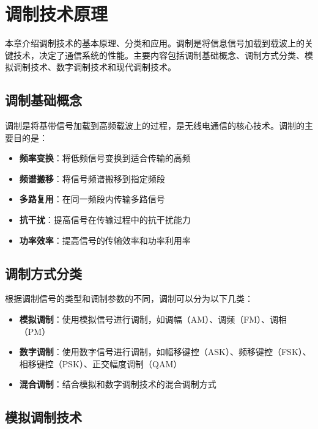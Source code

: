 \documentclass[12pt,UTF8]{ctexbook}
\begin{document}
\chapter{调制技术原理}

本章介绍调制技术的基本原理、分类和应用。调制是将信息信号加载到载波上的关键技术，决定了通信系统的性能。主要内容包括调制基础概念、调制方式分类、模拟调制技术、数字调制技术和现代调制技术。

\section{调制基础概念}

调制是将基带信号加载到高频载波上的过程，是无线电通信的核心技术。调制的主要目的是：

\begin{itemize}[leftmargin=3.5em]
    \item \textbf{频率变换}：将低频信号变换到适合传输的高频
    \item \textbf{频谱搬移}：将信号频谱搬移到指定频段
    \item \textbf{多路复用}：在同一频段内传输多路信号
    \item \textbf{抗干扰}：提高信号在传输过程中的抗干扰能力
    \item \textbf{功率效率}：提高信号的传输效率和功率利用率
\end{itemize}

\section{调制方式分类}

根据调制信号的类型和调制参数的不同，调制可以分为以下几类：

\begin{itemize}[leftmargin=3.5em]
    \item \textbf{模拟调制}：使用模拟信号进行调制，如调幅（AM）、调频（FM）、调相（PM）
    \item \textbf{数字调制}：使用数字信号进行调制，如幅移键控（ASK）、频移键控（FSK）、相移键控（PSK）、正交幅度调制（QAM）
    \item \textbf{混合调制}：结合模拟和数字调制技术的混合调制方式
\end{itemize}

\section{模拟调制技术}
\end{document}
